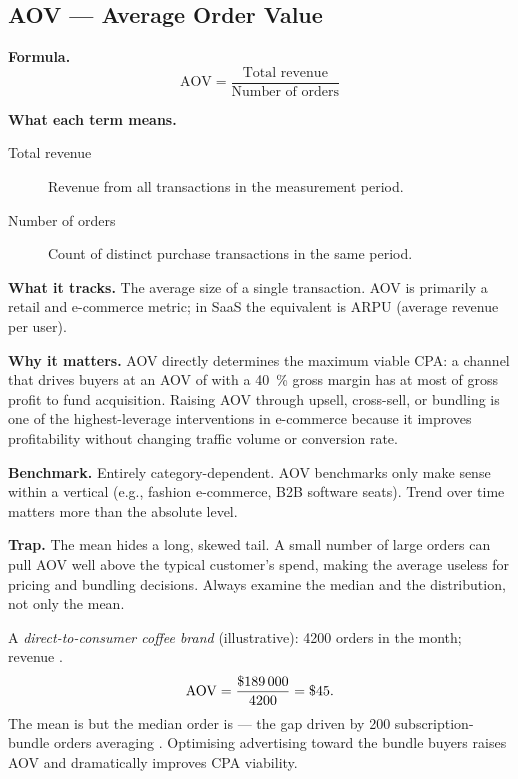 \subsection{AOV --- Average Order Value}

\textbf{Formula.}
\[
  \mathrm{AOV} = \frac{\text{Total revenue}}{\text{Number of orders}}
\]

\textbf{What each term means.}
\begin{description}
  \item[Total revenue] Revenue from all transactions in the measurement period.
  \item[Number of orders] Count of distinct purchase transactions in the same period.
\end{description}

\textbf{What it tracks.} The average size of a single transaction. AOV is primarily a
retail and e-commerce metric; in SaaS the equivalent is ARPU (average revenue per user).

\textbf{Why it matters.} AOV directly determines the maximum viable CPA: a channel that
drives buyers at an AOV of  with a \qty{40}{\percent} gross margin has at most
 of gross profit to fund acquisition. Raising AOV through upsell, cross-sell, or
bundling is one of the highest-leverage interventions in e-commerce because it improves
profitability without changing traffic volume or conversion rate.

\textbf{Benchmark.} Entirely category-dependent. AOV benchmarks only make sense within a
vertical (e.g., fashion e-commerce, B2B software seats). Trend over time matters more than
the absolute level.

\textbf{Trap.} The mean hides a long, skewed tail. A small number of large orders can pull
AOV well above the typical customer's spend, making the average useless for pricing and
bundling decisions. Always examine the median and the distribution, not only the mean.

\begin{example}
A \textit{direct-to-consumer coffee brand} (illustrative): \num{4200} orders in the month;
revenue .
\[
  \mathrm{AOV} = \frac{\$\num{189000}}{4200} = \$\num{45}.
\]
The mean is  but the median order is  --- the gap driven by 200
subscription-bundle orders averaging . Optimising advertising toward the bundle
buyers raises AOV and dramatically improves CPA viability.
\end{example}



